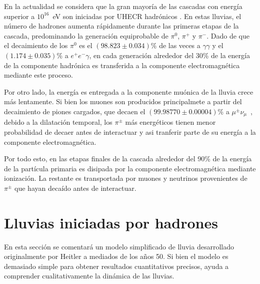 En la actualidad se considera que la gran mayoría de las cascadas con energía superior a $10^{16}$~eV son iniciadas por UHECR hadrónicos \cite{CONSEGUIR}. 
En estas lluvias, el número de hadrones aumenta rápidamente durante las primeras etapas de la cascada, predominando la generaci\'on equiprobable de $\pi^{0}$, $\pi^{+}$ y $\pi^{-}$.
Dado de que el decaimiento de los $\pi^{0}$ es el $(98.823\pm0.034)\%$ \cite{Agashe:2014kda} de las veces a $\gamma\gamma$ y el $(1.174\pm0.035)\%$ a $e^+e^-\gamma$, en cada generación alrededor del 30\% de la energía de la componente hadr\'onica es transferida a la componente electromagnética mediante este proceso.

Por otro lado, la energ\'ia es entregada a la componente muónica de la lluvia crece más lentamente. 
Si bien los muones son producidos principalmete a partir del decaimiento de piones cargados, que decaen el $(99.98770\pm0.00004)\%$ a $\mu^{\pm}\nu_\mu$~\cite{Agashe:2014kda}, debido a la dilatación temporal, los $\pi^{\pm}$ más energéticos tienen menor probabilidad de decaer antes de interactuar y asi tranferir parte de su energía a la componente electromagnética.

Por todo esto, en las etapas finales de la cascada alrededor del 90\% de la energía de la partícula primaria es disipada por la componente electromagnética mediante ionización.
La restante es transportada por muones y neutrinos provenientes de $\pi^{\pm}$ que hayan decaído antes de interactuar.

\section{Lluvias iniciadas por hadrones}
En esta sección se comentará un modelo simplificado de lluvia desarrollado originalmente por Heitler \cite{hei54} a mediados de los años 50. Si bien el modelo es demasiado simple para obtener resultados cuantitativos precisos, ayuda a comprender cualitativamente la dinámica de las lluvias.

